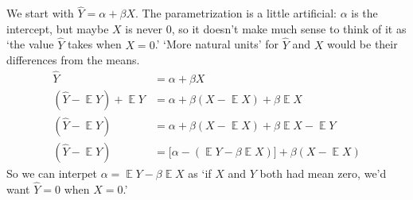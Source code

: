 \documentclass{article}
\DeclareMathOperator\E{\mathbb{E}}
\begin{document}
We start with \(\hat{Y} = \alpha + \beta X\).
The parametrization is a little artificial: \(\alpha\) is the intercept, but maybe \(X\) is never \(0\), so it doesn't make much sense to think of it as `the value \(\hat{Y}\) takes when \(X = 0\).'
`More natural units' for \(\hat{Y}\) and \(X\) would be their differences from the means.
\begin{align*}
\hat{Y} &= \alpha + \beta X\\
(\hat{Y} - \E Y) + \E Y&= \alpha + \beta (X - \E X) + \beta \E X\\
(\hat{Y} - \E Y) &= \alpha + \beta (X - \E X) + \beta \E X - \E Y\\
(\hat{Y} - \E Y) &= \big[\alpha - (\E Y - \beta \E X)\big] + \beta (X - \E X)
\end{align*}
So we can interpet \(\alpha = \E Y - \beta \E X\) as `if \(X\) and \(Y\) both had mean zero, we'd want \(\hat{Y} = 0\) when \(X = 0\).'
\end{document}
